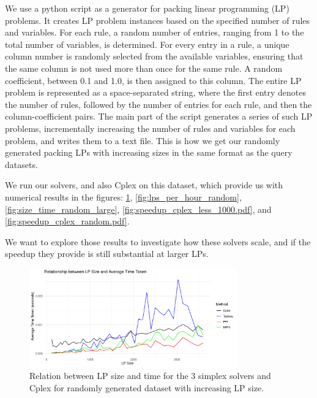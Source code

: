We use a python script as a generator for packing linear programming (LP) problems.
It creates LP problem instances
based on the specified number of rules and variables.
For each rule, a random number of entries, ranging from 1 to
the total number of variables, is determined.
For every entry in a rule, a unique column number is randomly selected from
the available variables, ensuring that the same column is not used more than once for
the same rule. A random coefficient, between 0.1 and 1.0, is then assigned to
this column. The entire LP problem is represented as a space-separated string,
where the first entry denotes the number of rules, followed by the number of
entries for each rule, and then the column-coefficient pairs.
The main part of
the script generates a series of such LP problems, incrementally increasing the
number of rules and variables for each problem, and writes them to a text file.
This is how we get our randomly generated packing LPs with increasing sizes in the same format
as the query datasets.

We run our solvers, and also Cplex on this dataset, which provide us with numerical results
in the figures: \ref{fig:time_vs_size_random}, \ref{fig:lps_per_hour_random}, \ref{fig:size_time_random_large},
\ref{fig:speedup_cplex_less_1000.pdf}, and \ref{fig:speedup_cplex_random.pdf}.

We want to
explore those results to investigate how these solvers scale, and if the speedup
they provide is still substantial at larger LPs.


\begin{figure}[!htb]
    \centering
    \includegraphics[width=0.8\textwidth]{figures/time_vs_size_random.pdf}
    \caption{Relation between LP size and time for the 3 simplex solvers and Cplex for randomly generated
        dataset with increasing LP size.}
    \label{fig:time_vs_size_random}
\end{figure}


